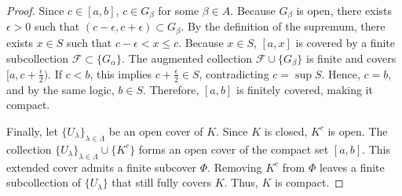 \begin{proof}
Since $c \in [a, b]$, $c \in G_\beta$ for some $\beta \in A$. Because $G_\beta$ is open, there exists $\epsilon > 0$ such that $(c - \epsilon, c + \epsilon) \subset G_\beta$. By the definition of the supremum, there exists $x \in S$ such that $c - \epsilon < x \le c$. Because $x \in S$, $[a, x]$ is covered by a finite subcollection $\mathcal{F} \subset \{G_\alpha\}$. The augmented collection $\mathcal{F} \cup \{G_\beta\}$ is finite and covers $[a, c + \frac{\epsilon}{2})$. If $c < b$, this implies $c + \frac{\epsilon}{2} \in S$, contradicting $c = \sup S$. Hence, $c = b$, and by the same logic, $b \in S$. Therefore, $[a, b]$ is finitely covered, making it compact.

Finally, let $\{U_\lambda\}_{\lambda \in \Lambda}$ be an open cover of $K$. Since $K$ is closed, $K^c$ is open. The collection $\{U_\lambda\}_{\lambda \in \Lambda} \cup \{K^c\}$ forms an open cover of the compact set $[a, b]$. This extended cover admits a finite subcover $\Phi$. Removing $K^c$ from $\Phi$ leaves a finite subcollection of $\{U_\lambda\}$ that still fully covers $K$. Thus, $K$ is compact.
\end{proof}